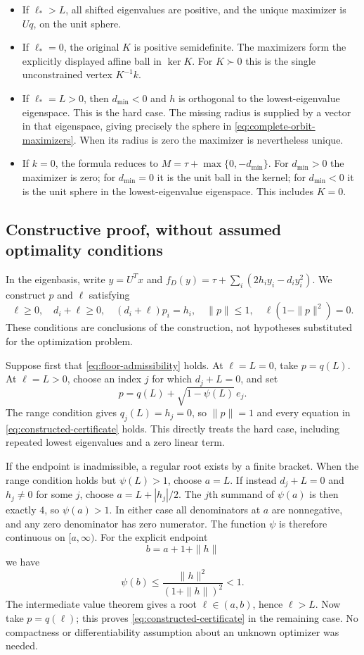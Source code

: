 \begin{itemize}
\item If $\ell_*>L$, all shifted eigenvalues are positive, and the unique
maximizer is $Uq$, on the unit sphere.
\item If $\ell_*=0$, the original $K$ is positive semidefinite.  The
maximizers form the explicitly displayed affine ball in $\ker K$.
For $K\succ0$ this is the single unconstrained vertex $K^{-1}k$.
\item If $\ell_*=L>0$, then $d_{\min}<0$ and $h$ is orthogonal to the
lowest-eigenvalue eigenspace.  This is the hard case.  The missing radius
is supplied by a vector in that eigenspace, giving precisely the sphere
in \eqref{eq:complete-orbit-maximizers}.  When its radius is zero the
maximizer is nevertheless unique.
\item If $k=0$, the formula reduces to $M=\tau+\max\{0,-d_{\min}\}$.
For $d_{\min}>0$ the maximizer is zero; for $d_{\min}=0$ it is the unit
ball in the kernel; for $d_{\min}<0$ it is the unit sphere in the
lowest-eigenvalue eigenspace.  This includes $K=0$.
\end{itemize}

\subsection{Constructive proof, without assumed optimality conditions}

In the eigenbasis, write $y=U^Tx$ and
$f_D(y)=\tau+\sum_i(2h_i y_i-d_i y_i^2)$.
We construct $p$ and $\ell$ satisfying
\begin{equation}
 \ell\geq0,\quad d_i+\ell\geq0,\quad
 (d_i+\ell)p_i=h_i,\quad
 \|p\|\leq1,\quad \ell(1-\|p\|^2)=0.
 \label{eq:constructed-certificate}
\end{equation}
These conditions are conclusions of the construction, not hypotheses
substituted for the optimization problem.

Suppose first that \eqref{eq:floor-admissibility} holds.
At $\ell=L=0$, take $p=q(L)$.  At $\ell=L>0$, choose an index $j$ for
which $d_j+L=0$, and set
\[
 p=q(L)+\sqrt{1-\psi(L)}\,e_j.
\]
The range condition gives $q_j(L)=h_j=0$, so $\|p\|=1$ and every equation
in \eqref{eq:constructed-certificate} holds.  This directly treats the
hard case, including repeated lowest eigenvalues and a zero linear term.

If the endpoint is inadmissible, a regular root exists by a finite bracket.
When the range condition holds but $\psi(L)>1$, choose $a=L$.
If instead $d_j+L=0$ and $h_j\ne0$ for some $j$, choose
$a=L+|h_j|/2$.  The $j$th summand of $\psi(a)$ is then exactly $4$,
so $\psi(a)>1$.  In either case all denominators at $a$ are nonnegative,
and any zero denominator has zero numerator.  The function $\psi$ is
therefore continuous on $[a,\infty)$.  For the explicit endpoint
\[
 b=a+1+\|h\|
\]
we have
\[
 \psi(b)\leq\frac{\|h\|^2}{(1+\|h\|)^2}<1.
\]
The intermediate value theorem gives a root $\ell\in(a,b)$, hence
$\ell>L$.  Now take $p=q(\ell)$; this proves
\eqref{eq:constructed-certificate} in the remaining case.  No compactness
or differentiability assumption about an unknown optimizer was needed.

